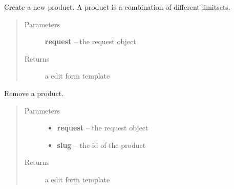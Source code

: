 \documentclass[letterpaper,10pt,english]{sphinxmanual}
\begin{document}

\begin{fulllineitems}
\label{api/system:limeade.system.views.product_add}
Create a new product. A product is a combination of different limitsets.
\begin{quote}\begin{description}
\item[{Parameters}] \leavevmode
\textbf{request} -- the request object

\item[{Returns}] \leavevmode
a edit form template

\end{description}\end{quote}

\end{fulllineitems}


\begin{fulllineitems}
\label{api/system:limeade.system.views.product_delete}
Remove a product.
\begin{quote}\begin{description}
\item[{Parameters}] \leavevmode\begin{itemize}
\item {} 
\textbf{request} -- the request object

\item {} 
\textbf{slug} -- the id of the product

\end{itemize}

\item[{Returns}] \leavevmode
a edit form template

\end{description}\end{quote}

\end{fulllineitems}

\end{document}
